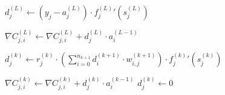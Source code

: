 \documentclass[titlepage]{article}
\begin{document}
          \begin{algorithm}
            \caption{%
              Modified version of algorithm \ref{algadjustgradient} with dropout
              regularization.
            } \label{algadjustgradientdropout}
            \begin{algorithmic}
                  \State $
                    d_j^{(L)} \gets
                      \left( y_j - a_j^{(L)} \right)
                      \cdot
                      {f_j^{(L)}}' \left( s_j^{(L)} \right)
                  $

                    \State $
                      \nabla C_{j,i}^{(L)} \gets
                        \nabla C_{j,i}^{(L)} + d_j^{(L)} \cdot a_i^{(L-1)}
                    $
                  \EndFor
                \EndFor

                      \State $
                        d_j^{(k)} \gets
                          r_j^{(k)}
                          \cdot
                          \left(
                            \sum_{i=0}^{n_{k+1}} d_i^{(k+1)} \cdot w_{i,j}^{(k+1)}
                          \right)
                          \cdot
                          {f_j^{(k)}}' \left( s_j^{(k)} \right)
                      $

                        \State $
                          \nabla C_{j,i}^{(k)} \gets
                            \nabla C_{j,i}^{(k)} + d_j^{(k)} \cdot a_i^{(k-1)}
                        $
                      \EndFor
                    \Else
                      \State $d_j^{(k)} \gets 0$
                    \EndIf
                  \EndFor
                \EndFor
              \EndProcedure
            \end{algorithmic}
          \end{algorithm}
\end{document}
